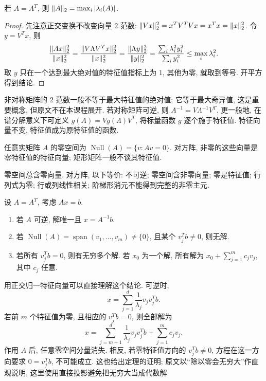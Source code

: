 \begin{theorem}\label{thm:symmetric-norm}
若 $A=A^T$, 则 $\lVert A\rVert_2=\max_i|\lambda_i(A)|$.
\end{theorem}
\begin{proof}
先注意正交变换不改变向量 $2$ 范数: $\lVert Vx\rVert_2^2=x^TV^TVx=x^Tx=\lVert x\rVert_2^2$. 令 $y=V^Tx$, 则
\[
\frac{\lVert Ax\rVert_2^2}{\lVert x\rVert_2^2}
=\frac{\lVert V\Lambda V^Tx\rVert_2^2}{\lVert x\rVert_2^2}
=\frac{\lVert \Lambda y\rVert_2^2}{\lVert y\rVert_2^2}
=\frac{\sum_i\lambda_i^2y_i^2}{\sum_i y_i^2}
\leq\max_i\lambda_i^2.
\]
取 $y$ 只在一个达到最大绝对值的特征值指标上为 $1$, 其他为零, 就取到等号. 开平方得到结论.
\end{proof}

非对称矩阵的 $2$ 范数一般不等于最大特征值的绝对值; 它等于最大奇异值, 这是重要概念, 但原文不在本课程展开. 若对称矩阵可逆, 则 $A^{-1}=V\Lambda^{-1}V^T$. 更一般地, 在谱分解意义下可定义 $g(A)=Vg(\Lambda)V^T$, 将标量函数 $g$ 逐个施于特征值. 特征向量不变, 特征值成为原特征值的函数.

\begin{definition}\label{def:nullspace}
任意实矩阵 $A$ 的零空间为 $\operatorname{Null}(A)=\{v:Av=0\}$. 对方阵, 非零的这些向量是零特征值的特征向量; 矩形矩阵一般不谈其特征值.
\end{definition}
零空间总含零向量. 对方阵, 以下等价: 不可逆; 零空间含非零向量; 零是特征值; 行列式为零; 行或列线性相关; 阶梯形消元不能得到完整的非零主元.

\begin{theorem}\label{thm:symmetric-solvability}
设 $A=A^T$, 考虑 $Ax=b$.
\begin{enumerate}
\item 若 $A$ 可逆, 解唯一且 $x=A^{-1}b$.
\item 若 $\operatorname{Null}(A)=\operatorname{span}(v_1,\ldots,v_m)\neq\{0\}$, 且某个 $v_j^Tb\neq0$, 则无解.
\item 若所有 $v_j^Tb=0$, 则有无穷多个解. 若 $x_0$ 为一个解, 所有解为 $x_0+\sum_{j=1}^{m}c_jv_j$, 其中 $c_j$ 任意.
\end{enumerate}
\end{theorem}

用正交归一特征向量可以直接理解这个结论. 可逆时,
\[
x=\sum_{j=1}^{d}\frac1{\lambda_j}v_jv_j^Tb.
\]
若前 $m$ 个特征值为零, 且相应的 $v_j^Tb=0$, 则全部解为
\[
x=\sum_{j=m+1}^{d}\frac1{\lambda_j}v_jv_j^Tb+\sum_{j=1}^{m}c_jv_j.
\]
作用 $A$ 后, 任意零空间分量消失. 相反, 若零特征值方向的 $v_j^Tb\neq0$, 方程在这一方向要求 $0=v_j^Tb$, 不可能成立. 这也给出定理的证明; 原文以“除以零会无穷大”作直观说明, 这里使用直接投影避免把无穷大当成代数解.


